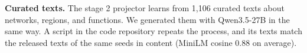 \documentclass[11pt]{article}
\begin{document}
\textbf{Curated texts.} The stage 2 projector learns from 1,106 curated texts about networks, regions, and functions. We generated them with Qwen3.5-27B in the same way. A script in the code repository repeats the process, and its texts match the released texts of the same seeds in content (MiniLM cosine 0.88 on average).
\end{document}
